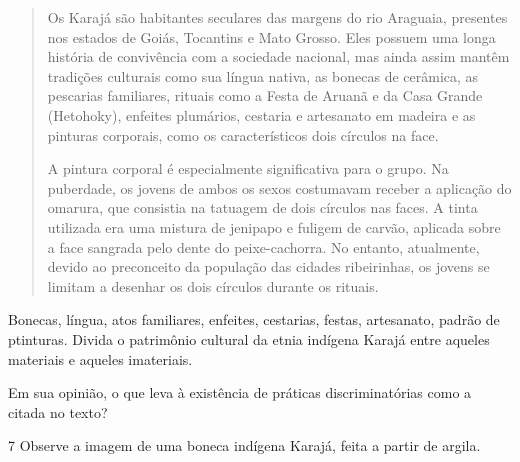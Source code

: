 \begin{quote}
Os Karajá são habitantes seculares das margens do rio Araguaia,
presentes nos estados de Goiás, Tocantins e Mato Grosso. Eles possuem
uma longa história de convivência com a sociedade nacional, mas ainda
assim mantêm tradições culturais como sua língua nativa, as bonecas de
cerâmica, as pescarias familiares, rituais como a Festa de Aruanã e da
Casa Grande (Hetohoky), enfeites plumários, cestaria e artesanato em
madeira e as pinturas corporais, como os característicos dois círculos
na face.

A pintura corporal é especialmente significativa para o grupo. Na
puberdade, os jovens de ambos os sexos costumavam receber a aplicação do
omarura, que consistia na tatuagem de dois círculos nas faces. A tinta
utilizada era uma mistura de jenipapo e fuligem de carvão, aplicada
sobre a face sangrada pelo dente do peixe-cachorra. No entanto,
atualmente, devido ao preconceito da população das cidades ribeirinhas,
os jovens se limitam a desenhar os dois círculos durante os rituais.

\end{quote}

\begin{escolha}
\item Bonecas, língua, atos familiares, enfeites, cestarias, festas,
artesanato, padrão de ptinturas. Divida o patrimônio cultural da etnia
indígena Karajá entre aqueles materiais e aqueles imateriais.


\item Em sua opinião, o que leva à existência de práticas discriminatórias
como a citada no texto?

\end{escolha}

\num{7} Observe a imagem de uma boneca indígena Karajá, feita a partir
de argila.


